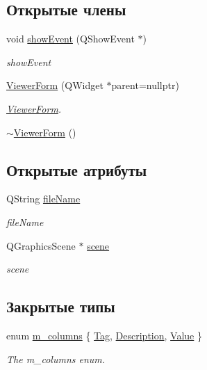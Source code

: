 \subsection*{Открытые члены}
\begin{DoxyCompactItemize}
\item 
void \hyperlink{classViewerForm_ae36251270d9db1b29cecb787876dfdc1}{show\+Event} (Q\+Show\+Event $\ast$)
\begin{DoxyCompactList}\small\item\em show\+Event \end{DoxyCompactList}\item 
\hyperlink{classViewerForm_ac64816c194730c3d825edbb7b7773dee}{Viewer\+Form} (Q\+Widget $\ast$parent=nullptr)
\begin{DoxyCompactList}\small\item\em \hyperlink{classViewerForm}{Viewer\+Form}. \end{DoxyCompactList}\item 
\hyperlink{classViewerForm_ac75f02831e65d75ef9b9843d9a180ee4}{$\sim$\+Viewer\+Form} ()
\end{DoxyCompactItemize}
\subsection*{Открытые атрибуты}
\begin{DoxyCompactItemize}
\item 
Q\+String \hyperlink{classViewerForm_ab2f0d1908098c723c3f52e89f69e46f4}{file\+Name}
\begin{DoxyCompactList}\small\item\em file\+Name \end{DoxyCompactList}\item 
Q\+Graphics\+Scene $\ast$ \hyperlink{classViewerForm_a65bd3ad0087e45497639bb3050084d0a}{scene}
\begin{DoxyCompactList}\small\item\em scene \end{DoxyCompactList}\end{DoxyCompactItemize}
\subsection*{Закрытые типы}
\begin{DoxyCompactItemize}
\item 
enum \hyperlink{classViewerForm_adb304869a7f4e7573df0e018cd03a845}{m\+\_\+columns} \{ \hyperlink{classViewerForm_adb304869a7f4e7573df0e018cd03a845a530374d647e5499f1079a433971650fd}{Tag}, 
\hyperlink{classViewerForm_adb304869a7f4e7573df0e018cd03a845a4106ad6b7649446b55c2fc0c9e546ca2}{Description}, 
\hyperlink{classViewerForm_adb304869a7f4e7573df0e018cd03a845a36c75b35df69479c62b3a215e7c8bb64}{Value}
 \}\begin{DoxyCompactList}\small\item\em The m\+\_\+columns enum. \end{DoxyCompactList}
\end{DoxyCompactItemize}
